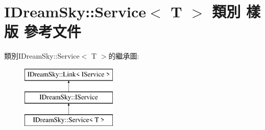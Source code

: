\hypertarget{class_i_dream_sky_1_1_service}{}\section{I\+Dream\+Sky\+:\+:Service$<$ T $>$ 類別 樣版 參考文件}
\label{class_i_dream_sky_1_1_service}
類別\+I\+Dream\+Sky\+:\+:Service$<$ T $>$的繼承圖\+:\begin{figure}[H]
\begin{center}
\leavevmode
\includegraphics[height=3.000000cm]{class_i_dream_sky_1_1_service}
\end{center}
\end{figure}
